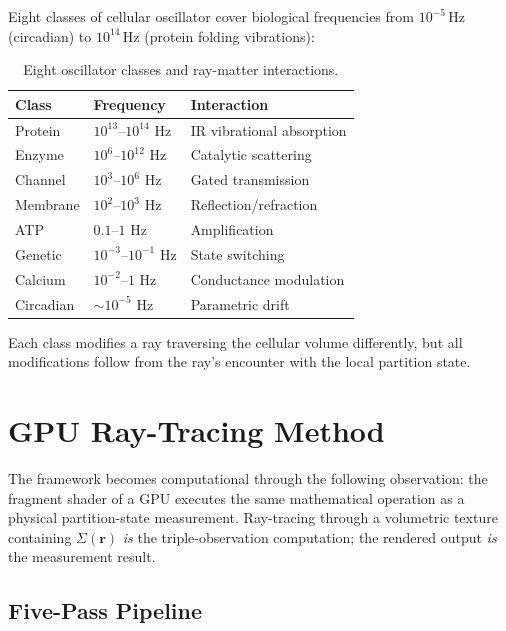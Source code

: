 \documentclass[twocolumn,10pt,a4paper]{article}
\theoremstyle{definition}
\theoremstyle{remark}
\begin{document}
Eight classes of cellular oscillator cover biological frequencies from $10^{-5}$\,Hz (circadian) to $10^{14}$\,Hz (protein folding vibrations):
\begin{table}[H]
\centering
\footnotesize
\caption{Eight oscillator classes and ray-matter interactions.}
\label{tab:oscillators}
\begin{tabular}{lll}
\toprule
Class & Frequency & Interaction \\
\midrule
Protein & $10^{13}$--$10^{14}$ Hz & IR vibrational absorption \\
Enzyme & $10^{6}$--$10^{12}$ Hz & Catalytic scattering \\
Channel & $10^{3}$--$10^{6}$ Hz & Gated transmission \\
Membrane & $10^{2}$--$10^{3}$ Hz & Reflection/refraction \\
ATP & $0.1$--$1$ Hz & Amplification \\
Genetic & $10^{-3}$--$10^{-1}$ Hz & State switching \\
Calcium & $10^{-2}$--$1$ Hz & Conductance modulation \\
Circadian & $\sim 10^{-5}$ Hz & Parametric drift \\
\bottomrule
\end{tabular}
\end{table}

Each class modifies a ray traversing the cellular volume differently, but all modifications follow from the ray's encounter with the local partition state.

\section{GPU Ray-Tracing Method}

The framework becomes computational through the following observation: the fragment shader of a GPU executes the same mathematical operation as a physical partition-state measurement. Ray-tracing through a volumetric texture containing $\Sigma(\mathbf{r})$ \emph{is} the triple-observation computation; the rendered output \emph{is} the measurement result.

\subsection{Five-Pass Pipeline}
\end{document}
